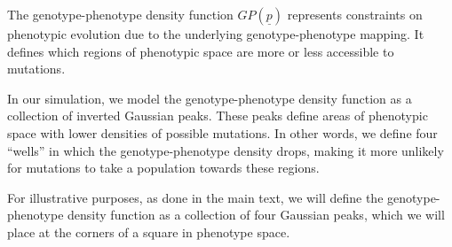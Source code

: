 \documentclass[
]{scrartcl}
\begin{document}
The genotype-phenotype density function \(GP(\underline{p})\) represents
constraints on phenotypic evolution due to the underlying
genotype-phenotype mapping. It defines which regions of phenotypic space
are more or less accessible to mutations.

In our simulation, we model the genotype-phenotype density function as a
collection of inverted Gaussian peaks. These peaks define areas of
phenotypic space with lower densities of possible mutations. In other
words, we define four ``wells'' in which the genotype-phenotype density
drops, making it more unlikely for mutations to take a population
towards these regions.

For illustrative purposes, as done in the main text, we will define the
genotype-phenotype density function as a collection of four Gaussian
peaks, which we will place at the corners of a square in phenotype
space.
\end{document}
